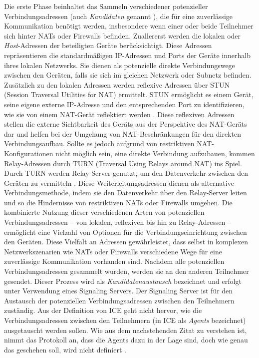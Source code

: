 Die erste Phase beinhaltet das Sammeln verschiedener potenzieller Verbindungsadressen (auch \textit{Kandidaten} genannt \parencite[S. 8]{rfc8445_ICE}), die für eine zuverlässige Kommunikation benötigt werden, insbesondere wenn einer oder beide Teilnehmer sich hinter NATs oder Firewalls befinden. Zuallererst werden die lokalen oder \textit{Host}-Adressen der beteiligten Geräte berücksichtigt. Diese Adressen repräsentieren die standardmäßigen IP-Adressen und Ports der Geräte innerhalb ihres lokalen Netzwerks. Sie dienen als potenzielle direkte Verbindungswege zwischen den Geräten, falls sie sich im gleichen Netzwerk oder Subnetz befinden.
Zusätzlich zu den lokalen Adressen werden reflexive Adressen über STUN (Session Traversal Utilities for NAT) ermittelt. STUN ermöglicht es einem Gerät, seine eigene externe IP-Adresse und den entsprechenden Port zu identifizieren, wie sie von einem NAT-Gerät reflektiert werden \parencite[S. 4]{rfc8489_STUN}. Diese reflexiven Adressen stellen die externe Sichtbarkeit des Geräts aus der Perspektive des NAT-Geräts dar und helfen bei der Umgehung von NAT-Beschränkungen für den direkten Verbindungsaufbau. Sollte es jedoch aufgrund von restriktiven NAT-Konfigurationen nicht möglich sein, eine direkte Verbindung aufzubauen, kommen Relay-Adressen durch TURN (Traversal Using Relays around NAT) ins Spiel.
Durch TURN werden Relay-Server genutzt, um den Datenverkehr zwischen den Geräten zu vermitteln \parencite[S. 10 f.]{rfc8656_TURN}. Diese Weiterleitungsadressen dienen als alternative Verbindungsmethode, indem sie den Datenverkehr über den Relay-Server leiten und so die Hindernisse von restriktiven NATs oder Firewalls umgehen.
Die kombinierte Nutzung dieser verschiedenen Arten von potenziellen Verbindungsadressen – von lokalen, reflexiven bis hin zu Relay-Adressen – ermöglicht eine Vielzahl von Optionen für die Verbindungseinrichtung zwischen den Geräten. Diese Vielfalt an Adressen gewährleistet, dass selbst in komplexen Netzwerkszenarien wie NATs oder Firewalls verschiedene Wege für eine zuverlässige Kommunikation vorhanden sind.
Nachdem alle potenziellen Verbindungsadressen gesammelt wurden, werden sie an den anderen Teilnehmer gesendet. Dieser Prozess wird als \textit{Kandidatenaustausch} bezeichnet und erfolgt unter Verwendung eines Signaling Servers. Der Signaling Server ist für den Austausch der potenziellen Verbindungsadressen zwischen den Teilnehmern zuständig. Aus der Definition von ICE geht nicht hervor, wie die Verbindungsadressen zwischen den Teilnehmern (in ICE als \textit{Agents} bezeichnet) ausgetauscht werden sollen. Wie aus dem nachstehenden Zitat zu verstehen ist, nimmt das Protokoll an, dass die Agents dazu in der Lage sind, doch wie genau das geschehen soll, wird nicht definiert \Parencite[S. 7 ff.]{rfc8445_ICE}.

